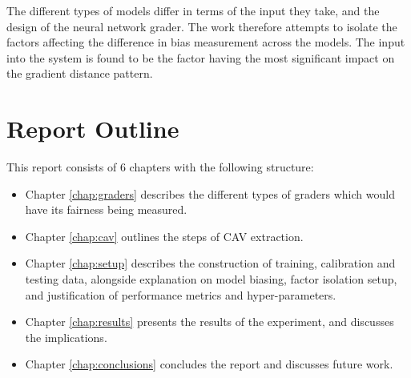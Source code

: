 The different types of models differ in terms of the input they take, and the design of the neural network grader. The work therefore attempts to isolate the factors affecting the difference in bias measurement across the models. The input into the system is found to be the factor having the most significant impact on the gradient distance pattern.

\section{Report Outline}
This report consists of 6 chapters with the following structure:
\begin{itemize}
    \item Chapter \ref{chap:graders} describes the different types of graders which would have its fairness being measured.
    \item Chapter \ref{chap:cav} outlines the steps of CAV extraction.
    \item Chapter \ref{chap:setup} describes the construction of training, calibration and testing data, alongside explanation on model biasing, factor isolation setup, and justification of performance metrics and hyper-parameters.
    \item Chapter \ref{chap:results} presents the results of the experiment, and discusses the implications.
    \item Chapter \ref{chap:conclusions} concludes the report and discusses future work.
\end{itemize}